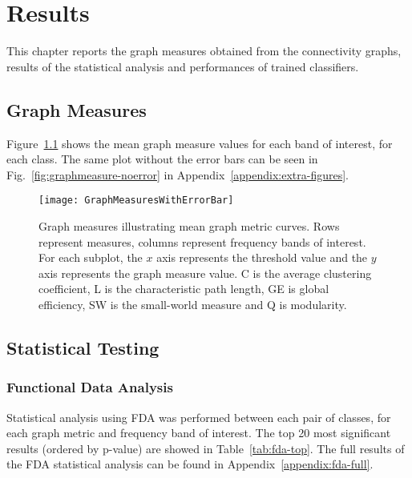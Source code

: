 
\chapter{Results}
	
	This chapter reports the graph measures obtained from the connectivity graphs, results of the statistical analysis and performances of trained classifiers.  
	

	\section{Graph Measures}
		
		Figure~\ref{fig:graphmeasure-witherror} shows the mean graph measure values for each band of interest, for each class. The same plot without the error bars can be seen in Fig.~\ref{fig:graphmeasure-noerror} in Appendix~\ref{appendix:extra-figures}. 
		
		\begin{figure}
		    \centering
		    \captionsetup{justification=centering}
		    \begin{adjustwidth}{-5em}{-2em}
		    \centering
		    \texttt{[image: GraphMeasuresWithErrorBar]}
		    \end{adjustwidth}
		    \caption{Graph measures illustrating mean graph metric curves. Rows represent measures, columns represent frequency bands of interest. For each subplot, the \(x\) axis represents the threshold value and the \(y\) axis represents the graph measure value. C is the average clustering coefficient, L is the characteristic path length, GE is global efficiency, SW is the small-world measure and Q is modularity.}
		    \label{fig:graphmeasure-witherror}
		\end{figure}

	\section{Statistical Testing}
		\subsection{Functional Data Analysis}
		Statistical analysis using \ac{FDA} was performed between each pair of classes, for each graph metric and frequency band of interest. The top 20 most significant results (ordered by p-value) are showed in Table~\ref{tab:fda-top}. The full results of the \ac{FDA} statistical analysis can be found in Appendix~\ref{appendix:fda-full}. 

